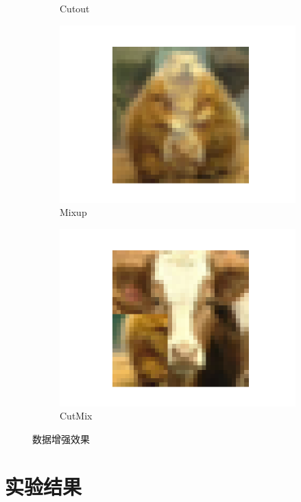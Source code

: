 \documentclass{article}
\begin{document}
\begin{figure}[h]
\begin{subfigure}{0.19\textwidth}
\caption{Cutout}
\end{subfigure}
\begin{subfigure}{0.19\textwidth}
\includegraphics[width=\linewidth]{figure/mixup2.png}
\caption{Mixup}
\end{subfigure}
\begin{subfigure}{0.19\textwidth}
\includegraphics[width=\linewidth]{figure/cutmix2.png}
\caption{CutMix}
\end{subfigure}
\caption{数据增强效果}
\label{fig:DAeffect}
\end{figure}

\section{实验结果}
\end{document}
